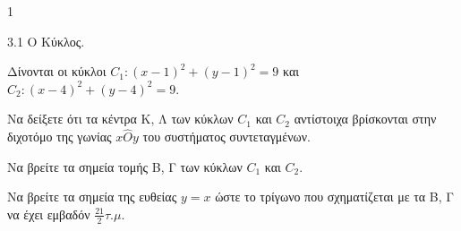 \begin{ylh}{1}
    \item 3.1 Ο Κύκλος.
\end{ylh}
Δίνονται οι κύκλοι $C_1 : (x-1)^2+(y-1)^2=9$ και $C_2 : (x-4)^2+(y-4)^2=9$.
\begin{alist}
\item Να δείξετε ότι τα κέντρα K, Λ των κύκλων $C_1$ και $C_2$ αντίστοιχα βρίσκονται στην διχοτόμο της γωνίας $x\hat{O}y$ του συστήματος συντεταγμένων. 
\item Να βρείτε τα σημεία τομής B, Γ των κύκλων $C_1$ και $C_2$. 
\item Να βρείτε τα σημεία της ευθείας $y=x$ ώστε το τρίγωνο που σχηματίζεται με τα B, Γ να έχει εμβαδόν $\frac{21}{2} \tau.\mu.$ 
\end{alist}